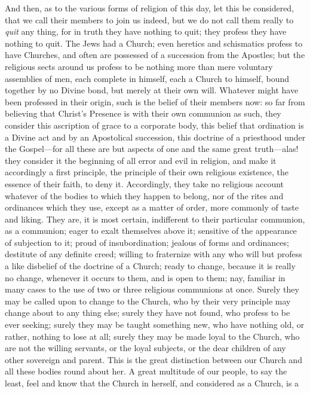 And then, as to the various forms of religion of this day, let this
be considered, that we call their members to join us indeed, but we do
not call them really to \emph{quit} any thing, for in truth they have
nothing to quit; they profess they have nothing to quit. The Jews had
a Church; even heretics and schismatics profess to have Churches, and
often are possessed of a succession from the Apostles; but the
religious sects around us profess to be nothing more than mere
voluntary assemblies of men, each complete in himself, each a Church
to himself, bound together by no Divine bond, but merely at their own
will. Whatever might have been professed in their origin, such is the
belief of their members now: so far from believing that Christ's
Presence is with their own communion as such, they consider this
ascription of grace to a corporate body, this belief that ordination
is a Divine act and by an Apostolical succession, this doctrine of a
priesthood under the Gospel—for all these are but aspects of one and
the same great truth—alas! they consider it the beginning of all
error and evil in religion, and make it accordingly a first principle,
the principle of their own religious existence, the essence of their
faith, to deny it. Accordingly, they take no religious account
whatever of the bodies to which they happen to belong, nor of the
rites and ordinances which they use, except as a matter of order, more
commonly of taste and liking. They are, it is most certain,
indifferent to their particular communion, as a communion; eager to
exalt themselves above it; sensitive of the appearance of subjection
to it; proud of insubordination; jealous of forms and ordinances;
destitute of any definite creed; willing to fraternize with any who
will but profess a like disbelief of the doctrine of a Church; ready
to change, because it is really no change, whenever it occurs to them,
and is open to them; nay, familiar in many cases to the use of two or
three religious communions at once. Surely they may be called upon to
change to the Church, who by their very principle may change about to
any thing else; surely they have not found, who profess to be ever
seeking; surely they may be taught something new, who have nothing
old, or rather, nothing to lose at all; surely they may be made loyal
to the Church, who are not the willing servants, or the loyal
subjects, or the dear children of any other sovereign and parent. This
is the great distinction between our Church and all these bodies round
about her. A great multitude of our people, to say the least, feel and
know that the Church in herself, and considered as a Church, is a
